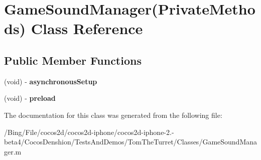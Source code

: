 \hypertarget{interface_game_sound_manager_07_private_methods_08}{\section{Game\-Sound\-Manager(Private\-Methods) Class Reference}
\label{interface_game_sound_manager_07_private_methods_08}
}
\subsection*{Public Member Functions}
\begin{DoxyCompactItemize}
\item 
\hypertarget{interface_game_sound_manager_07_private_methods_08_ac8a1bfcf34bfbb6c5f1ba7e861c51fd7}{(void) -\/ {\bfseries asynchronous\-Setup}}\label{interface_game_sound_manager_07_private_methods_08_ac8a1bfcf34bfbb6c5f1ba7e861c51fd7}

\item 
\hypertarget{interface_game_sound_manager_07_private_methods_08_a74adc41f3797357e0edcc306d03e53b1}{(void) -\/ {\bfseries preload}}\label{interface_game_sound_manager_07_private_methods_08_a74adc41f3797357e0edcc306d03e53b1}

\end{DoxyCompactItemize}


The documentation for this class was generated from the following file\-:\begin{DoxyCompactItemize}
\item 
/\-Bing/\-File/cocos2d/cocos2d-\/iphone/cocos2d-\/iphone-\/2.-\/beta4/\-Cocos\-Denshion/\-Tests\-And\-Demos/\-Tom\-The\-Turret/\-Classes/Game\-Sound\-Manager.\-m\end{DoxyCompactItemize}
